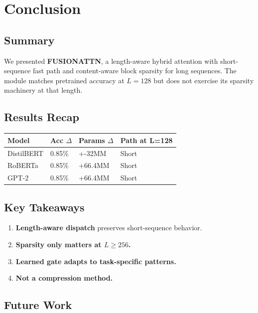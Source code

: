 \section{Conclusion}

\subsection{Summary}

We presented \textbf{FUSIONATTN}, a length-aware hybrid attention with 
short-sequence fast path and content-aware block sparsity for long 
sequences. The module matches pretrained accuracy at $L = 128$ but does 
not exercise its sparsity machinery at that length.

\subsection{Results Recap}

\begin{table}[H]
\centering
\small
\begin{tabular}{llll}
\toprule
\textbf{Model} & \textbf{Acc $\Delta$} & \textbf{Params $\Delta$} & \textbf{Path at L=128} \\
\midrule
DistilBERT & 0.85\% & +-32MM & Short \\
RoBERTa & 0.85\% & +66.4MM & Short \\
GPT-2 & 0.85\% & +66.4MM & Short \\
\bottomrule
\end{tabular}
\end{table}

\subsection{Key Takeaways}

\begin{enumerate}
\item \textbf{Length-aware dispatch} preserves short-sequence behavior.
\item \textbf{Sparsity only matters at $L \geq 256$.}
\item \textbf{Learned gate adapts to task-specific patterns.}
\item \textbf{Not a compression method.}

\end{enumerate}
\subsection{Future Work}

